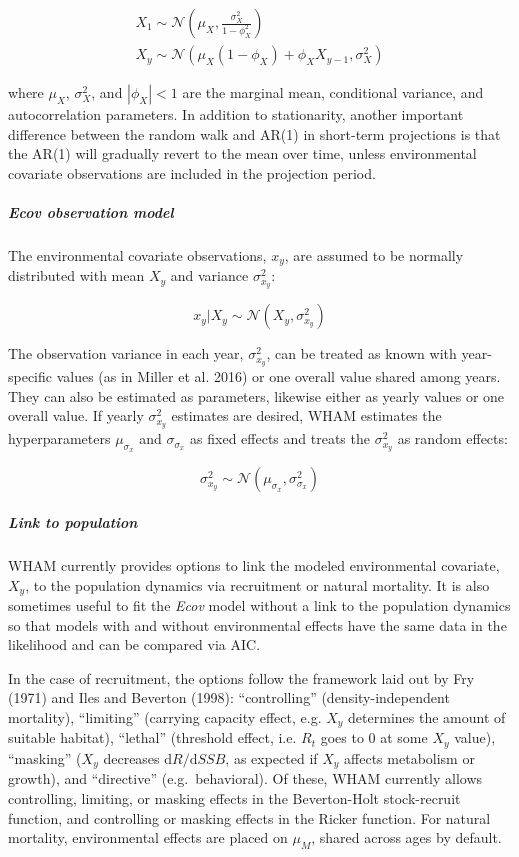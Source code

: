 \documentclass[]{article}
\let\oldsubparagraph\subparagraph
\renewcommand{\subparagraph}[1]{\oldsubparagraph{#1}\mbox{}}
\begin{document}
\begin{equation}
  \begin{array}{cc}
    X_1 \sim \mathcal{N} \left( \mu_X, \frac{\sigma^2_X}{1-\phi^2_X} \right) \\
    X_y \sim \mathcal{N} \left( \mu_X(1-\phi_X) + \phi_X X_{y-1}, \sigma^2_X \right)
  \end{array}
\end{equation}

where \(\mu_X\), \(\sigma^2_X\), and \(|\phi_X| < 1\) are the marginal
mean, conditional variance, and autocorrelation parameters. In addition
to stationarity, another important difference between the random walk
and AR(1) in short-term projections is that the AR(1) will gradually
revert to the mean over time, unless environmental covariate
observations are included in the projection period.

\hypertarget{ecov-observation-model}{%
\subparagraph{\texorpdfstring{\emph{Ecov} observation
model}{Ecov observation model}}\label{ecov-observation-model}}

The environmental covariate observations, \(x_y\), are assumed to be
normally distributed with mean \(X_y\) and variance \(\sigma^2_{x_y}\):

\[x_y | X_y \sim \mathcal{N}\left( X_y, \sigma^2_{x_y} \right)\]

The observation variance in each year, \(\sigma^2_{x_y}\), can be
treated as known with year-specific values (as in Miller et al. 2016) or
one overall value shared among years. They can also be estimated as
parameters, likewise either as yearly values or one overall value. If
yearly \(\sigma^2_{x_y}\) estimates are desired, WHAM estimates the
hyperparameters \(\mu_{\sigma_x}\) and \(\sigma_{\sigma_x}\) as fixed
effects and treats the \(\sigma^2_{x_y}\) as random effects:

\[\sigma^2_{x_y} \sim \mathcal{N} \left( \mu_{\sigma_x}, \sigma^2_{\sigma_x} \right)\]

\hypertarget{link-to-population}{%
\subparagraph{Link to population}\label{link-to-population}}

WHAM currently provides options to link the modeled environmental
covariate, \(X_y\), to the population dynamics via recruitment or
natural mortality. It is also sometimes useful to fit the \emph{Ecov}
model without a link to the population dynamics so that models with and
without environmental effects have the same data in the likelihood and
can be compared via AIC.

In the case of recruitment, the options follow the framework laid out by
Fry (1971) and Iles and Beverton (1998): ``controlling''
(density-independent mortality), ``limiting'' (carrying capacity effect,
e.g. \(X_y\) determines the amount of suitable habitat), ``lethal''
(threshold effect, i.e. \(R_t\) goes to 0 at some \(X_y\) value),
``masking'' (\(X_y\) decreases \(\text{d}R/\text{d}SSB\), as expected if
\(X_y\) affects metabolism or growth), and ``directive''
(e.g.~behavioral). Of these, WHAM currently allows controlling,
limiting, or masking effects in the Beverton-Holt stock-recruit
function, and controlling or masking effects in the Ricker function. For
natural mortality, environmental effects are placed on \(\mu_M\), shared
across ages by default.
\end{document}
